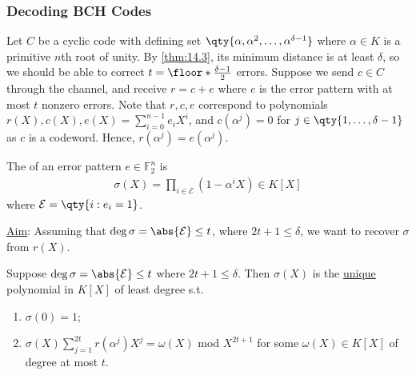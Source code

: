 \subsubsection{Decoding BCH Codes}

Let $C$ be a cyclic code with defining set $\qty{\alpha, \alpha^2, \dots, \alpha^{\delta - 1}}$ where $\alpha \in K$ is a primitive $n$th root of unity.
By \cref{thm:14.3}, its minimum distance is at least $\delta$, so we should be able to correct $t = \floor*{\frac{\delta - 1}{2}}$ errors.
Suppose we send $c \in C$ through the channel, and receive $r = c + e$ where $e$ is the error pattern with at most $t$ nonzero errors.
Note that $r, c, e$ correspond to polynomials $r(X), c(X), e(X) = \sum_{i=0}^{n-1} e_i X^i$, and $c(\alpha^j) = 0$ for $j \in \qty{1, \dots, \delta - 1}$ as $c$ is a codeword.
Hence, $r(\alpha^j) = e(\alpha^j)$.

\begin{definition}
    The  of an error pattern $e \in \mathbb F_2^n$ is
    \begin{align*}
        \sigma(X) = \prod_{i \in \mathcal E} (1 - \alpha^i X) \in K[X]
    \end{align*}
    where $\mathcal E = \qty{i : e_i = 1}$.
\end{definition}

\underline{Aim}: Assuming that $\deg \sigma = \abs{\mathcal E} \leq t$, where $2t + 1 \leq \delta$, we want to recover $\sigma$ from $r(X)$.

\begin{theorem}
    Suppose $\deg \sigma = \abs{\mathcal E} \leq t$ where $2t + 1 \leq \delta$.
    Then $\sigma(X)$ is the \underline{unique} polynomial in $K[X]$ of least degree s.t.
    \begin{enumerate}
        \item $\sigma(0) = 1$;
        \item $\sigma(X) \sum_{j=1}^{2t} r(\alpha^j) X^j = \omega(X)$ mod $X^{2t+1}$ for some $\omega(X) \in K[X]$ of degree at most $t$.
    \end{enumerate}
\end{theorem}

